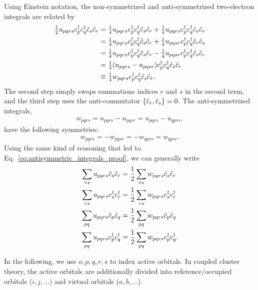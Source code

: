 \documentclass[aip,jcp,preprint,superscriptaddress,nofootinbib]{revtex4-1}
\begin{document}
Using Einstein notation, the non-symmetrized and anti-symmetrized two-electron integrals
are related by
\begin{align} \label{eq:antisymmetric_integrals_proof}
    \tfrac{1}{2} u_{pqrs} c^{\dagger}_{p} c^{\dagger}_{q} \tilde{c}_{s} \tilde{c}_{r}
    &= \tfrac{1}{4} u_{pqrs} c^{\dagger}_{p} c^{\dagger}_{q} \tilde{c}_{s} \tilde{c}_{r}
    +  \tfrac{1}{4} u_{pqrs} c^{\dagger}_{p} c^{\dagger}_{q} \tilde{c}_{s} \tilde{c}_{r} \nonumber\\
    &= \tfrac{1}{4} u_{pqrs} c^{\dagger}_{p} c^{\dagger}_{q} \tilde{c}_{s} \tilde{c}_{r}
    +  \tfrac{1}{4} u_{pqsr} c^{\dagger}_{p} c^{\dagger}_{q} \tilde{c}_{r} \tilde{c}_{s} \nonumber\\
    &= \tfrac{1}{4} u_{pqrs} c^{\dagger}_{p} c^{\dagger}_{q} \tilde{c}_{s} \tilde{c}_{r}
    -  \tfrac{1}{4} u_{pqsr} c^{\dagger}_{p} c^{\dagger}_{q} \tilde{c}_{s} \tilde{c}_{r} \nonumber\\
    &= \tfrac{1}{4}  (u_{pqrs} - u_{pqsr}) c^{\dagger}_{p} c^{\dagger}_{q} \tilde{c}_{s} \tilde{c}_{r} \nonumber\\
    &\equiv \tfrac{1}{4}  w_{pqrs} c^{\dagger}_{p} c^{\dagger}_{q} \tilde{c}_{s} \tilde{c}_{r}.
\end{align}
The second step simply swaps summations indices $r$ and $s$ in the second
term, and the third step uses the anti-commutator $\{\tilde{c}_{r},  \tilde{c}_{s} \} = 0$.
The anti-symmetrized integrals,
\begin{align}
    w_{pqrs} = u_{pqrs} - u_{pqsr} = u_{pqrs} - u_{qprs},
\end{align}
have the following symmetries:
\begin{align}
    w_{pqrs} = -w_{pqsr} = -w_{qprs} = w_{qpsr}.
\end{align}
Using the same kind of reasoning that led to Eq.~\eqref{eq:antisymmetric_integrals_proof}, 
we can generally write
\begin{subequations}
    \begin{align}
        \sum_{rs} u_{pqrs} \tilde{c}_{s} \tilde{c}_{r} &= \frac{1}{2} \sum_{rs} w_{pqrs} \tilde{c}_{s} \tilde{c}_{r} \\
        \sum_{rs} u_{pqrs} c^{\dagger}_{s} c^{\dagger}_{r} &= \frac{1}{2} \sum_{rs} w_{pqrs} c^{\dagger}_{s} c^{\dagger}_{r} \\
        \sum_{pq} u_{pqrs} \tilde{c}_{p} \tilde{c}_{q} &= \frac{1}{2} \sum_{pq} w_{pqrs} \tilde{c}_{p} \tilde{c}_{q} \\
        \sum_{pq} u_{pqrs} c^{\dagger}_{p} c^{\dagger}_{q} &= \frac{1}{2} \sum_{pq} w_{pqrs} c^{\dagger}_{p} c^{\dagger}_{q}.
    \end{align}
\end{subequations}

In the following, we use $o,p,q,r,s$ to index active orbitals. In coupled cluster
theory, the active orbitals are additionally divided into reference/occupied orbitals ($i,j,\ldots$)
and virtual orbitals ($a,b,\ldots$).
\end{document}

